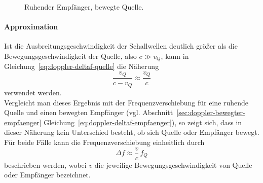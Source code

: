 \documentclass[
	german,%
	accentcolor=3d,%
	type=intern, %
	marginpar=false,%
]{tudapub}
\begin{document}
      \begin{figure}[htbp]
         \centering
         \caption{Ruhender Empfänger, bewegte Quelle.}\label{fig:ruhender-empfaenger-bewegte-quelle}
      \end{figure}


      \paragraph*{Approximation}
      Ist die Ausbreitungsgeschwindigkeit der Schallwellen deutlich größer als die Bewegungsgeschwindigkeit der Quelle, also \(c \gg v_Q\), kann in Gleichung~\eqref{eq:doppler-deltaf-quelle} die Näherung
      \begin{equation}
         \frac{v_Q}{c - v_Q} \approx \frac{v_Q}{c}
         \label{eq:doppler-naeherung}
      \end{equation}
      verwendet werden.\\
      Vergleicht man dieses Ergebnis mit der Frequenzverschiebung für eine ruhende Quelle und einen bewegten Empfänger (vgl. Abschnitt~\ref{sec:doppler-bewegter-empfaenger} Gleichung~\ref{eq:doppler-deltaf-empfaenger}), so zeigt sich, dass in dieser Näherung kein Unterschied besteht, ob sich Quelle oder Empfänger bewegt. Für beide Fälle kann die Frequenzverschiebung einheitlich durch
      \begin{equation}
         \Delta f \approx \frac{v}{c}\, f_Q
         \label{eq:doppler-deltaf-allg}
      \end{equation}
      beschrieben werden, wobei \(v\) die jeweilige Bewegungsgeschwindigkeit von Quelle oder Empfänger bezeichnet.
\end{document}
